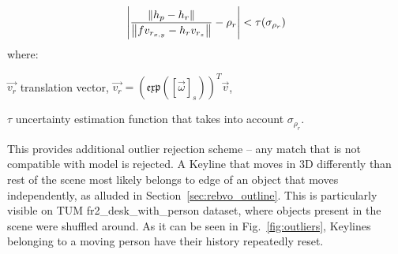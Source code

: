 \begin{equation}
\abs* {\frac{\norm*{h_p - h_r}}{\norm*{fv_{r_{x,y}}-h_{r}v_{r_z}} }-\rho_{r}} < \tau(\sigma_{\rho_{r}})
\label{eq:consistency}
\end{equation}
where:
\begin{eqwhere}[2cm]
	\item[$\vec{v_r}$] translation vector, $\vec{v_r} = \left( \mathfrak{exp} \left ( \left[ \vec{\omega} \right ]_{s} \right ) \right) ^T \vec{v}$,
	\item[$\tau$] uncertainty estimation function that takes into account $\sigma_{\rho_{r}}$.
\end{eqwhere}

This provides additional outlier rejection scheme -- any match that is not compatible with model is rejected. A Keyline that moves in 3D differently than rest of the scene most likely belongs to edge of an object that moves independently, as alluded in Section~\ref{sec:rebvo_outline}. This is particularly visible on TUM fr2\_desk\_with\_person dataset, where objects present in the scene were shuffled around. As it can be seen in Fig.~\ref{fig:outliers}, Keylines belonging to a moving person have their history repeatedly reset.

